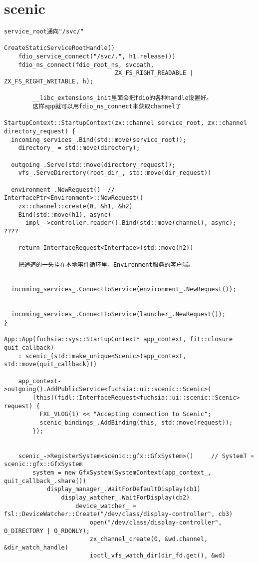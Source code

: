 \section{scenic}

\begin{verbatim}
service_root通向"/svc/"

CreateStaticServiceRootHandle()
    fdio_service_connect("/svc/.", h1.release())
    fdio_ns_connect(fdio_root_ns, svcpath,
                               ZX_FS_RIGHT_READABLE | ZX_FS_RIGHT_WRITABLE, h);

        __libc_extensions_init里面会把fdio的各种handle设置好。
        这样app就可以用fdio_ns_connect来获取channel了

StartupContext::StartupContext(zx::channel service_root, zx::channel directory_request) {
  incoming_services_.Bind(std::move(service_root));
    directory_ = std::move(directory);
  
  outgoing_.Serve(std::move(directory_request));
    vfs_.ServeDirectory(root_dir_, std::move(dir_request))
  
  environment_.NewRequest()  // InterfacePtr<Environment>::NewRequest()
    zx::channel::create(0, &h1, &h2)
    Bind(std::move(h1), async)
      impl_->controller.reader().Bind(std::move(channel), async);  ????
    
    return InterfaceRequest<Interface>(std::move(h2))

    把通道的一头挂在本地事件循环里，Environment服务的客户端。


  incoming_services_.ConnectToService(environment_.NewRequest());


  incoming_services_.ConnectToService(launcher_.NewRequest());
}

App::App(fuchsia::sys::StartupContext* app_context, fit::closure quit_callback)
    : scenic_(std::make_unique<Scenic>(app_context, std::move(quit_callback)))

    app_context->outgoing().AddPublicService<fuchsia::ui::scenic::Scenic>(
        [this](fidl::InterfaceRequest<fuchsia::ui::scenic::Scenic> request) {
          FXL_VLOG(1) << "Accepting connection to Scenic";
          scenic_bindings_.AddBinding(this, std::move(request));
        });


    scenic_->RegisterSystem<scenic::gfx::GfxSystem>()     // SystemT = scenic::gfx::GfxSystem
        system = new GfxSystem(SystemContext(app_context_, quit_callback_.share())
            display_manager_.WaitForDefaultDisplay(cb1)
                display_watcher_.WaitForDisplay(cb2)
                    device_watcher_ = fsl::DeviceWatcher::Create("/dev/class/display-controller", cb3)
                        open("/dev/class/display-controller", O_DIRECTORY | O_RDONLY);
                        zx_channel_create(0, &wd.channel, &dir_watch_handle)
                        ioctl_vfs_watch_dir(dir_fd.get(), &wd)


\end{verbatim}
